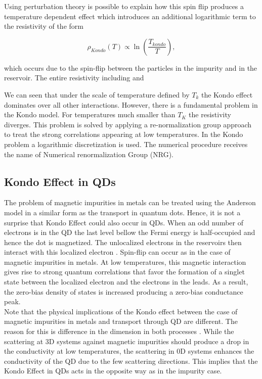 Using perturbation theory is possible to explain how this spin flip produces a  temperature dependent effect which  introduces an additional logarithmic term to the resistivity of the form

\begin{equation}
\rho_{Kondo}(T) \propto \ln{\left( \frac{T_{kondo}}{T} \right)},
\label{logKondo}
\end{equation}



which occurs due to the spin-flip between the particles in the impurity and in the reservoir. The entire resistivity including  and 

We can seen that under the scale of temperature defined by $T_k$ the Kondo effect dominates over all other interactions. However, there is a fundamental problem in the Kondo model. For temperatures much smaller than $T_K$ the resistivity diverges. This problem is solved by applying a re-normalization group approach to treat the strong correlations appearing at low temperatures. In the Kondo problem a logarithmic discretization is used. The numerical procedure receives the name of Numerical renormalization Group (NRG). 


\subsection{Kondo Effect in QDs}


The problem of magnetic impurities in metals can be treated using the Anderson model in a similar form as the transport
 in quantum dots. Hence, it is not a surprise that Kondo Effect could also occur in QDs. When an odd number of electrons is in the QD the last level bellow the Fermi energy is half-occupied and hence the dot is magnetized. The unlocalized electrons in the reservoirs then interact with this localized electron . Spin-flip can occur as in the case of  magnetic impurities in metals. At low temperatures, this magnetic  interaction gives rise to strong quantum correlations that favor the formation of a singlet state between the localized electron and the electrons in the leads. As a result, the zero-bias density of states is increased producing a zero-bias conductance peak. \\

Note that the physical implications of the Kondo effect  between the case of magnetic impurities in metals and transport through QD are different. The reason for this is difference in the dimension in both processes . While the scattering at 3D systems against magnetic impurities should produce a drop in the conductivity at low temperatures, the scattering in 0D systems enhances the conductivity of the QD due to the few scattering directions. This implies that the Kondo Effect in QDs acts in the opposite way as in the impurity case. 

















